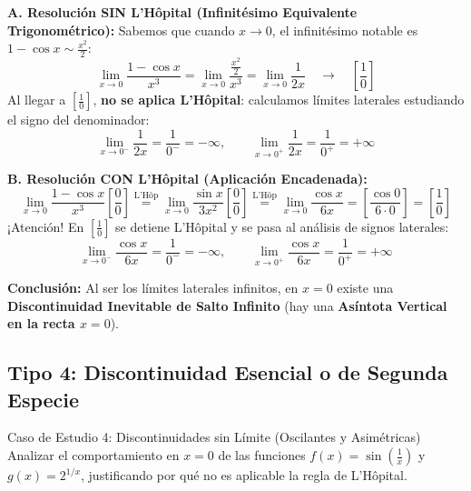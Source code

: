 \documentclass[10pt,a4paper]{article}
\begin{document}
\textbf{A. Resolución SIN L'Hôpital (Infinitésimo Equivalente Trigonométrico):}
Sabemos que cuando $x \to 0$, el infinitésimo notable es $1 - \cos x \sim \frac{x^2}{2}$:
$$\lim_{x \to 0} \frac{1 - \cos x}{x^3} = \lim_{x \to 0} \frac{\frac{x^2}{2}}{x^3} = \lim_{x \to 0} \frac{1}{2x} \quad \longrightarrow \quad \left[\frac{1}{0}\right]$$
Al llegar a $\left[\frac{1}{0}\right]$, \textbf{no se aplica L'Hôpital}: calculamos límites laterales estudiando el signo del denominador:
$$\lim_{x \to 0^-} \frac{1}{2x} = \frac{1}{0^-} = \mathbf{-\infty}, \qquad \lim_{x \to 0^+} \frac{1}{2x} = \frac{1}{0^+} = \mathbf{+\infty}$$

\textbf{B. Resolución CON L'Hôpital (Aplicación Encadenada):}
$$\lim_{x \to 0} \frac{1 - \cos x}{x^3} \left[\frac{0}{0}\right] \stackrel{\text{L'Hôp}}{=} \lim_{x \to 0} \frac{\sin x}{3x^2} \left[\frac{0}{0}\right] \stackrel{\text{L'Hôp}}{=} \lim_{x \to 0} \frac{\cos x}{6x} = \left[\frac{\cos 0}{6 \cdot 0}\right] = \left[\frac{1}{0}\right]$$
¡Atención! En $\left[\frac{1}{0}\right]$ se detiene L'Hôpital y se pasa al análisis de signos laterales:
$$\lim_{x \to 0^-} \frac{\cos x}{6x} = \frac{1}{0^-} = \mathbf{-\infty}, \qquad \lim_{x \to 0^+} \frac{\cos x}{6x} = \frac{1}{0^+} = \mathbf{+\infty}$$

\textbf{Conclusión:} Al ser los límites laterales infinitos, en $x = 0$ existe una \textbf{Discontinuidad Inevitable de Salto Infinito} (hay una \textbf{Asíntota Vertical en la recta $x = 0$}).

\vspace{4mm}

\subsection{Tipo 4: Discontinuidad Esencial o de Segunda Especie}

\begin{ejemplobox}{Caso de Estudio 4: Discontinuidades sin Límite (Oscilantes y Asimétricas)}
Analizar el comportamiento en $x = 0$ de las funciones $f(x) = \sin\left(\frac{1}{x}\right)$ y $g(x) = 2^{1/x}$, justificando por qué no es aplicable la regla de L'Hôpital.
\end{ejemplobox}
\end{document}
